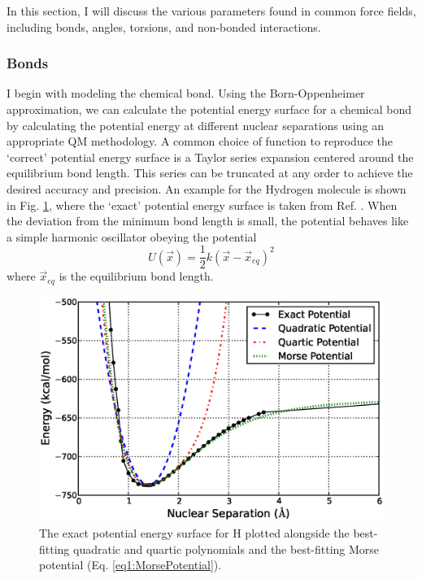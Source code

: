 In this section, I will discuss the various parameters found in common force
fields, including bonds, angles, torsions, and non-bonded interactions.

\subsubsection{Bonds}
\label{sec1:Bond}

I begin with modeling the chemical bond. Using the Born-Oppenheimer
approximation, we can calculate the potential energy surface for a chemical bond
by calculating the potential energy at different nuclear separations using an
appropriate QM methodology. A common choice of function to reproduce the
`correct' potential energy surface is a Taylor series expansion centered around
the equilibrium bond length. This series can be truncated at any order to
achieve the desired accuracy and precision.  An example for the Hydrogen
molecule is shown in Fig.  \ref{fig1:HydrogenMoleculeBond}, where the `exact'
potential energy surface is taken from Ref. . When the
deviation from the minimum bond length is small, the potential behaves like a
simple harmonic oscillator obeying the potential
\begin{equation}
   U(\vec{x}) = \frac 1 2 k (\vec{x} - \vec{x}_{eq}) ^ 2
   \label{eq1:HarmonicOscillator}
\end{equation}
where $\vec{x}_{eq}$ is the equilibrium bond length.

\begin{figure}
   \includegraphics[width=6.5in]{HydrogenMoleculeBond.ps}
   \caption{The exact potential energy surface for H \cite{Kolos1964}
            plotted alongside the best-fitting quadratic and quartic polynomials
            and the best-fitting Morse potential (Eq.
            \ref{eq1:MorsePotential}).}
   \label{fig1:HydrogenMoleculeBond}
\end{figure}

